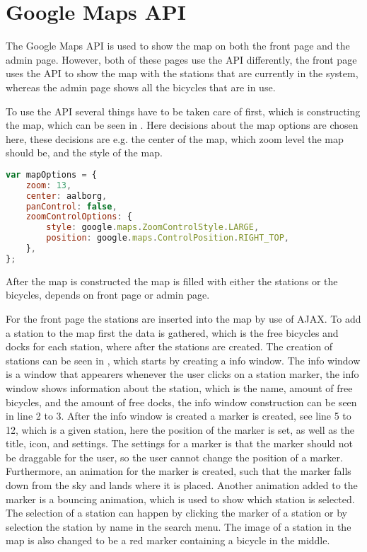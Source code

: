 \section{Google Maps API}
The Google Maps API \citep{misc:googlemapsapi} is used to show the map on both the front page and the admin page.
However, both of these pages use the API differently, the front page uses the API to show the map with the stations that are currently in the system, whereas the admin page shows all the bicycles that are in use.

To use the API several things have to be taken care of first, which is constructing the map, which can be seen in .
Here decisions about the map options are chosen here, these decisions are e.g. the center of the map, which zoom level the map should be, and the style of the map.

\begin{minipage}{\textwidth}
\begin{lstlisting}[caption={Construction of the map}, label={lst:mapoptions}, language=Javascript]
var mapOptions = {
	zoom: 13,
	center: aalborg,
	panControl: false,
    zoomControlOptions: {
		style: google.maps.ZoomControlStyle.LARGE,
		position: google.maps.ControlPosition.RIGHT_TOP,
	},
};
\end{lstlisting}
\end{minipage}

After the map is constructed the map is filled with either the stations or the bicycles, depends on front page or admin page.

For the front page the stations are inserted into the map by use of AJAX.
To add a station to the map first the data is gathered, which is the free bicycles and docks for each station, where after the stations are created.
The creation of stations can be seen in , which starts by creating a info window.
The info window is a window that appearers whenever the user clicks on a station marker, the info window shows information about the station, which is the name, amount of free bicycles, and the amount of free docks, the info window construction can be seen in line 2 to 3.
After the info window is created a marker is created, see line 5 to 12, which is a given station, here the position of the marker is set, as well as the title, icon, and settings.
The settings for a marker is that the marker should not be draggable for the user, so the user cannot change the position of a marker.
Furthermore, an animation for the marker is created, such that the marker falls down from the sky and lands where it is placed.
Another animation added to the marker is a bouncing animation, which is used to show which station is selected. The selection of a station can happen by clicking the marker of a station or by selection the station by name in the search menu.
The image of a station in the map is also changed to be a red marker containing a bicycle in the middle.


